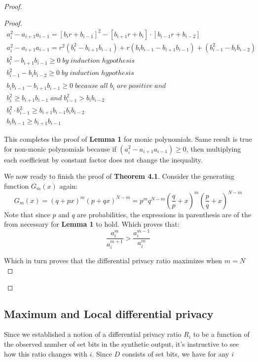 \documentclass[11pt,draft]{article}
\begin{document}
\begin{proof}
\begin{proof}
\begin{align}
a_i^2 - a_{i+1}a_{i-1} =  [b_ir + b_{i-1}]^2 -  [b_{i+1}r + b_i] \cdot [b_{i-1}r + b_{i-2}]  \\
a_i^2 - a_{i+1}a_{i-1} = r^2 (b_i^2 - b_{i+1}b_{i-1}) + r (b_i b_{i-1} - b_{i+1}b_{i-1}) + (b_{i-1}^2 - b_ib_{i-2}) \\
b_i^2 - b_{i+1}b_{i-1} \ge 0 \; by \; induction \; hypothesis \\
b_{i-1}^2 - b_ib_{i-2} \ge 0  \; by \; induction \; hypothesis \\
\\
b_i b_{i-1} - b_{i+1}b_{i-1} \ge 0 \; because \; all \; b_i \; are \; positive \; and \\
b_i^2 \ge b_{i+1} b_{i-1} \; and \; b_{i-1}^2 > b_ib_{i-2} \\
b_i^2 \cdot b_{i-1}^2 \ge b_{i+1} b_{i-1} b_ib_{i-2} \\
b_i b_{i-1} \ge b_{i+1}b_{i-1}
\end{align}

This completes the proof of  \textbf{Lemma 1}  for monic polynomials.  Same result is true for non-monic polynomials because if   $ (a_i^2 - a_{i+1}a_{i-1})  \ge 0 $, then multiplying each coefficient by constant factor does not change the inequality.  

We now ready to finish the proof of \textbf{Theorem 4.1}.  Consider the generating function $G_m(x)$ again:
\[
G_m(x) = (q + px)^m (p + qx)^{N-m} = p^m q^{N-m}  \left (\frac{q}{p} + x \right )^m \left (\frac{p}{q} + x \right )^{N-m}
\]
Note that since $p$ and $q$ are probabilities, the expressions in parenthesis are of the from necessary for \textbf{Lemma 1} to hold. Which proves that:
\[
\frac{a_i^m}{a_i^{m+1}} > \frac{a_i^{m-1}}{a_i^{m}}
\] 

Which in turn proves that the differential privacy ratio maximizes when $m=N$
\end{proof}
\end{proof}

\subsection{Maximum and Local differential privacy}

Since we established a notion of a differential privacy ratio $R_i$ to be a function of the observed number of set bits in the synthetic output, it's instructive to see how this ratio changes with $i$.   Since $D$ consists of set bits, we have for any $i$
\end{document}
